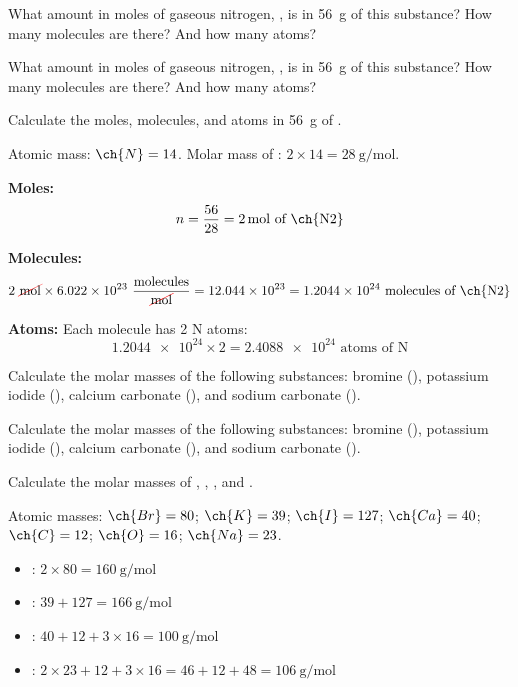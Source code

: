 \begin{exercise}
    What amount in moles of gaseous nitrogen, , is in \qty{56}{\g} of this substance? How many molecules are there? And how many atoms?
    \begin{solu}
        What amount in moles of gaseous nitrogen, , is in \qty{56}{\g} of this substance? How many molecules are there? And how many atoms?

        Calculate the moles, molecules, and atoms in \qty{56}{\g} of .

        Atomic mass: \( \ch{N} = 14 \). Molar mass of : \( 2 \times 14 = \qty{28}{\g\per\mole} \).

        \textbf{Moles:}
        \begin{equation*}
            n = \dfrac{56}{28} = \qty{2}{\mole} \text{ of \ch{N2}}
        \end{equation*}

        \textbf{Molecules:}
        \begin{equation*}
            2\ \cancelred{\unit{\mole}} \times \num{6.022e23}\ \dfrac{\text{molecules}}{\cancelred{\unit{\mole}}} = \num{12.044e23} = \num{1.2044e24} \text{ molecules of \ch{N2}}
        \end{equation*}

        \textbf{Atoms:} Each  molecule has 2 N atoms:
        \begin{equation*}
            \num{1.2044e24} \times 2 = \num{2.4088e24} \text{ atoms of N}
        \end{equation*}
    \end{solu}
\end{exercise}

\begin{exercise}
    Calculate the molar masses of the following substances: bromine (), potassium iodide (), calcium carbonate (), and sodium carbonate ().
    \begin{solu}
        Calculate the molar masses of the following substances: bromine (), potassium iodide (), calcium carbonate (), and sodium carbonate ().

        Calculate the molar masses of , , , and .

        Atomic masses: \( \ch{Br} = 80 \); \( \ch{K} = 39 \); \( \ch{I} = 127 \); \( \ch{Ca} = 40 \); \( \ch{C} = 12 \); \( \ch{O} = 16 \); \( \ch{Na} = 23 \).
        \begin{itemize}
            \item {}: \( 2 \times 80 = \qty{160}{\g\per\mole} \)
            \item {}: \( 39 + 127 = \qty{166}{\g\per\mole} \)
            \item {}: \( 40 + 12 + 3 \times 16 = \qty{100}{\g\per\mole} \)
            \item {}: \( 2 \times 23 + 12 + 3 \times 16 = 46 + 12 + 48 = \qty{106}{\g\per\mole} \)
        \end{itemize}
    \end{solu}
\end{exercise}

